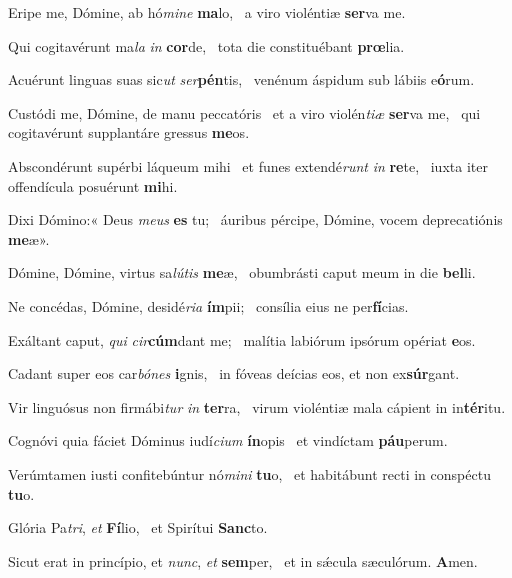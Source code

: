 \item Eripe me, Dómine, ab hó\textit{mine} \textbf{ma}lo,~\psstar{} a viro violéntiæ \textbf{ser}va me.

\item Qui cogitavérunt ma\textit{la} \textit{in} \textbf{cor}de,~\psstar{} tota die constituébant \textbf{prœ}lia.

\item Acuérunt linguas suas sic\textit{ut} \textit{ser}\textbf{pén}tis,~\psstar{} venénum áspidum sub lábiis e\textbf{ó}rum.

\item Custódi me, Dómine, de manu peccatóris~\pscross{} et a viro violén\textit{tiæ} \textbf{ser}va me,~\psstar{} qui cogitavérunt supplantáre gressus \textbf{me}os.

\item Abscondérunt supérbi láqueum mihi~\pscross{} et funes extendé\textit{runt} \textit{in} \textbf{re}te,~\psstar{} iuxta iter offendícula posuérunt \textbf{mi}hi.

\item Dixi Dómino:« Deus \textit{meus} \textbf{es} tu;~\psstar{} áuribus pércipe, Dómine, vocem deprecatiónis \textbf{me}æ».

\item Dómine, Dómine, virtus sa\textit{lútis} \textbf{me}æ,~\psstar{} obumbrásti caput meum in die \textbf{bel}li.

\item Ne concédas, Dómine, desidé\textit{ria} \textbf{ím}pii;~\psstar{} consília eius ne per\textbf{fí}cias.

\item Exáltant caput, \textit{qui} \textit{cir}\textbf{cúm}dant me;~\psstar{} malítia labiórum ipsórum opériat \textbf{e}os.

\item Cadant super eos car\textit{bónes} \textbf{i}gnis,~\psstar{} in fóveas deícias eos, et non ex\textbf{súr}gant.

\item Vir linguósus non firmábi\textit{tur} \textit{in} \textbf{ter}ra,~\psstar{} virum violéntiæ mala cápient in in\textbf{tér}itu.

\item Cognóvi quia fáciet Dóminus iudí\textit{cium} \textbf{ín}opis~\psstar{} et vindíctam \textbf{páu}perum.

\item Verúmtamen iusti confitebúntur nó\textit{mini} \textbf{tu}o,~\psstar{} et habitábunt recti in conspéctu \textbf{tu}o.

\item Glória Pa\textit{tri}, \textit{et} \textbf{Fí}lio,~\psstar{} et Spirítui \textbf{Sanc}to.

\item Sicut erat in princípio, et \textit{nunc}, \textit{et} \textbf{sem}per,~\psstar{} et in sǽcula sæculórum. \textbf{A}men.
